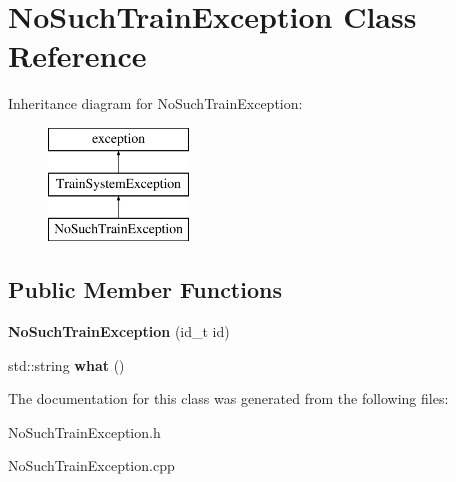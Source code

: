 \hypertarget{classNoSuchTrainException}{}\section{No\+Such\+Train\+Exception Class Reference}
\label{classNoSuchTrainException}
Inheritance diagram for No\+Such\+Train\+Exception\+:\begin{figure}[H]
\begin{center}
\leavevmode
\includegraphics[height=3.000000cm]{classNoSuchTrainException}
\end{center}
\end{figure}
\subsection*{Public Member Functions}
\begin{DoxyCompactItemize}
\item 
\mbox{\label{classNoSuchTrainException_ae60439498bd6e552159ed1c50335daba}} 
{\bfseries No\+Such\+Train\+Exception} (id\+\_\+t id)
\item 
\mbox{\label{classNoSuchTrainException_a812ae27b54620f59e0a9e23969935099}} 
std\+::string {\bfseries what} ()
\end{DoxyCompactItemize}


The documentation for this class was generated from the following files\+:\begin{DoxyCompactItemize}
\item 
No\+Such\+Train\+Exception.\+h\item 
No\+Such\+Train\+Exception.\+cpp\end{DoxyCompactItemize}
